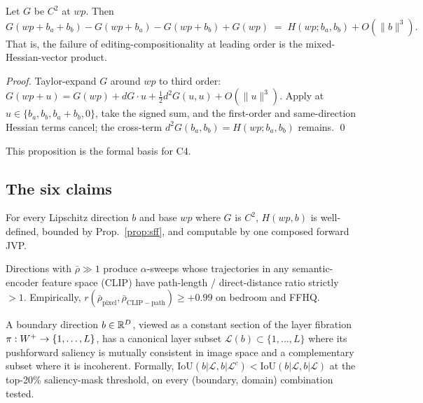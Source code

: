 \begin{proposition}
Let $G$ be $C^2$ at $wp$. Then
\begin{equation}
  G(wp + b_a + b_b) - G(wp + b_a) - G(wp + b_b) + G(wp)
  \;=\; H(wp; b_a, b_b) + O(\|b\|^3).
\end{equation}
That is, the failure of editing-compositionality at leading order is
the mixed-Hessian-vector product.
\end{proposition}
\begin{proof}
Taylor-expand $G$ around $wp$ to third order: $G(wp + u) = G(wp) +
dG\cdot u + \tfrac12 d^2 G(u, u) + O(\|u\|^3)$. Apply at $u \in
\{b_a, b_b, b_a + b_b, 0\}$, take the signed sum, and the
first-order and same-direction Hessian terms cancel; the cross-term
$d^2 G(b_a, b_b) = H(wp; b_a, b_b)$ remains.
\qed
\end{proof}

This proposition is the formal basis for C4.

\subsection{The six claims}
\begin{claim}\label{cl:c1}
For every Lipschitz direction $b$ and base $wp$ where $G$ is $C^2$,
$H(wp, b)$ is well-defined, bounded by Prop.~\ref{prop:sff}, and
computable by one composed forward JVP.
\end{claim}

\begin{claim}\label{cl:c2}
Directions with $\bar\rho \gg 1$ produce $\alpha$-sweeps whose
trajectories in any semantic-encoder feature space (CLIP) have
path-length / direct-distance ratio strictly $>1$. Empirically,
$r(\bar\rho_{\mathrm{pixel}}, \bar\rho_{\mathrm{CLIP-path}}) \geq
+0.99$ on bedroom and FFHQ.
\end{claim}

\begin{claim}\label{cl:c3}
A boundary direction $b \in \mathbb{R}^D$, viewed as a constant section of
the layer fibration $\pi : W^+ \to \{1,\dots,L\}$, has a canonical
layer subset $\mathcal{L}(b) \subset \{1,\dots,L\}$ where its
pushforward saliency is mutually consistent in image space and a
complementary subset where it is incoherent. Formally,
$\mathrm{IoU}(b|\mathcal{L}, b|\mathcal{L}^c) <
\mathrm{IoU}(b|\mathcal{L}, b|\mathcal{L})$
at the top-20\% saliency-mask threshold, on every (boundary,
domain) combination tested.
\end{claim}

